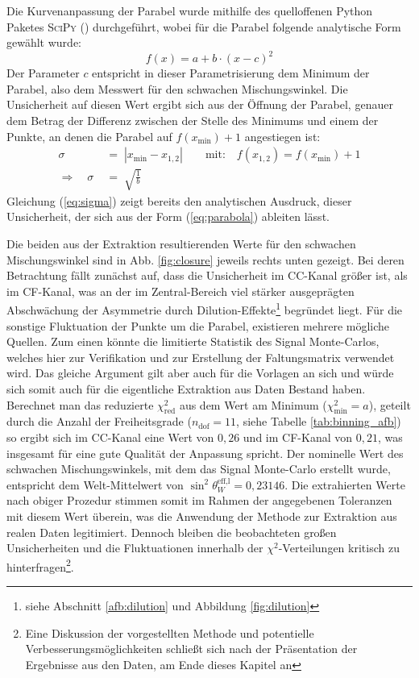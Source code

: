 Die Kurvenanpassung der Parabel wurde mithilfe des quelloffenen Python Paketes
\textsc{SciPy} (\cite{scipy}) durchgeführt, wobei für die Parabel folgende
analytische Form gewählt wurde:
\begin{equation}
    f(x)=a+b\cdot(x-c)^2
    \label{eq:parabola}
\end{equation}
Der Parameter $c$ entspricht in dieser Parametrisierung dem Minimum der
Parabel, also dem Messwert für den schwachen Mischungswinkel. Die Unsicherheit
auf diesen Wert ergibt sich aus der Öffnung der Parabel, genauer dem Betrag der
Differenz zwischen der Stelle des Minimums und einem der Punkte, an denen die
Parabel auf $f(x_\text{min})+1$ angestiegen ist:
\begin{align}
    \sigma \;&=\; |x_\text{min} - x_{1,2}|
        \qquad \text{mit:} \quad f(x_{1,2}) = f(x_\text{min})+1
        \\[5pt]
    \Longrightarrow \quad \sigma \;&=\; \sqrt{\frac{1}{b}}
    \label{eq:sigma}
\end{align}
Gleichung (\ref{eq:sigma}) zeigt bereits den analytischen Ausdruck, dieser
Unsicherheit, der sich aus der Form (\ref{eq:parabola}) ableiten lässt.

Die beiden aus der Extraktion resultierenden Werte für den schwachen
Mischungswinkel sind in Abb. \ref{fig:closure} jeweils rechts unten gezeigt.
Bei deren Betrachtung fällt zunächst auf, dass die Unsicherheit im
\ac{CC}-Kanal größer ist, als im \ac{CF}-Kanal, was an der im Zentral-Bereich
viel stärker ausgeprägten Abschwächung der Asymmetrie durch
Dilution-Effekte\footnote{siehe Abschnitt \ref{afb:dilution} und Abbildung
\ref{fig:dilution}} begründet liegt. Für die sonstige Fluktuation der Punkte um
die Parabel, existieren mehrere mögliche Quellen. Zum einen könnte die
limitierte Statistik des Signal Monte-Carlos, welches hier zur Verifikation und
zur Erstellung der Faltungsmatrix verwendet wird. Das gleiche Argument gilt
aber auch für die Vorlagen an sich und würde sich somit auch für die
eigentliche Extraktion aus Daten Bestand haben. Berechnet man das reduzierte
$\chi^2_\text{red}$ aus dem Wert am Minimum ($\chi^2_\text{min} = a$), geteilt
durch die Anzahl der Freiheitsgrade ($n_\text{dof} = 11$, siehe Tabelle
\ref{tab:binning_afb}) so ergibt sich im \ac{CC}-Kanal eine Wert von $0,26$
und im \ac{CF}-Kanal von $0,21$, was insgesamt für eine gute Qualität der
Anpassung spricht. Der nominelle Wert des schwachen Mischungswinkels, mit dem
das Signal Monte-Carlo erstellt wurde, entspricht dem Welt-Mittelwert von
$\sin^2\theta_W^\text{eff,l}=0,23146$. Die extrahierten Werte nach obiger
Prozedur stimmen somit im Rahmen der angegebenen Toleranzen mit diesem Wert
überein, was die Anwendung der Methode zur Extraktion aus realen Daten
legitimiert. Dennoch bleiben die beobachteten großen Unsicherheiten und die
Fluktuationen innerhalb der $\chi^2$-Verteilungen kritisch zu
hinterfragen\footnote{Eine Diskussion der vorgestellten Methode und potentielle
Verbesserungsmöglichkeiten schließt sich nach der Präsentation der Ergebnisse
aus den Daten, am Ende dieses Kapitel an}.

